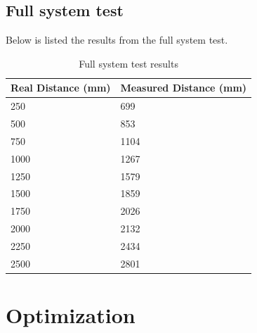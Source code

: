 \subsection{Full system test}
Below is listed the results from the full system test.
\begin{table}[H]
\centering
    \begin{tabular}{|l|l|}
    \hline
    Real Distance (mm) & Measured Distance (mm) \\ \hline
    250                & 699                    \\ \hline
    500                & 853                    \\ \hline
    750                & 1104                   \\ \hline
    1000               & 1267                   \\ \hline
    1250               & 1579                   \\ \hline
    1500               & 1859                   \\ \hline
    1750               & 2026                   \\ \hline
    2000               & 2132                   \\ \hline
    2250               & 2434                   \\ \hline
    2500               & 2801                   \\ \hline
    \end{tabular}
    \caption{Full system test results}
\end{table}
\section{Optimization}
